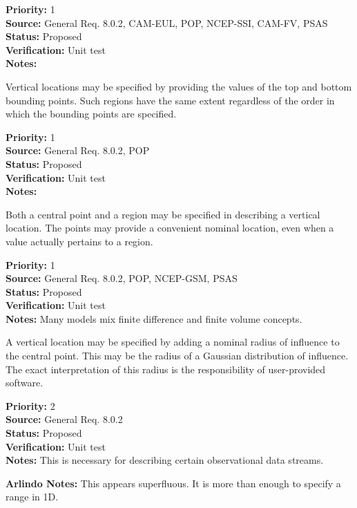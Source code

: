 \begin{reqlist}
{\bf Priority:} 1 \\
{\bf Source:} General Req. 8.0.2, CAM-EUL, POP, NCEP-SSI,
              CAM-FV, PSAS \\
{\bf Status:} Proposed \\
{\bf Verification:} Unit test\\
{\bf Notes:} 
\end{reqlist}


Vertical locations may be specified by providing the values of the top and
bottom bounding points.  Such regions have the same extent regardless of the
order in which the bounding points are specified.
\begin{reqlist}
{\bf Priority:} 1 \\
{\bf Source:} General Req. 8.0.2, POP \\
{\bf Status:} Proposed \\
{\bf Verification:} Unit test\\
{\bf Notes:} 
\end{reqlist}


  Both a central point and a region may be specified in describing a vertical
location.  The points may provide a convenient nominal location, even when
a value actually pertains to a region.
\begin{reqlist}
{\bf Priority:} 1 \\
{\bf Source:} General Req. 8.0.2, POP, NCEP-GSM,
              PSAS \\
{\bf Status:} Proposed \\
{\bf Verification:} Unit test\\
{\bf Notes:} Many models mix finite difference and finite volume concepts.
\end{reqlist}


  A vertical location may be specified by adding a nominal radius of
influence to the central point.  This may be the radius of a Gaussian
distribution of influence. The exact interpretation of this radius is
the responsibility of user-provided software.
\begin{reqlist}
{\bf Priority:} 2 \\
{\bf Source:} General Req. 8.0.2 \\
{\bf Status:} Proposed \\
{\bf Verification:} Unit test\\
{\bf Notes:} This is necessary for describing certain observational data streams.
\end{reqlist}
{\bf Arlindo Notes: } This appears superfluous. It is more than enough to specify a range in 1D.
 
